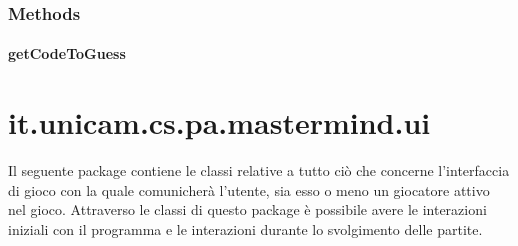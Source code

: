 \documentclass[letterpaper,10pt,italian]{sphinxmanual}
\begin{document}
\subsubsection{Methods}
\label{\detokenize{source/it/unicam/cs/pa/mastermind/players/RandomBotMaker:methods}}

\paragraph{getCodeToGuess}
\label{\detokenize{source/it/unicam/cs/pa/mastermind/players/RandomBotMaker:getcodetoguess}}

\begin{fulllineitems}
\label{\detokenize{source/it/unicam/cs/pa/mastermind/players/RandomBotMaker:it.unicam.cs.pa.mastermind.players.RandomBotMaker.getCodeToGuess(InteractionView)}}
\end{fulllineitems}



\section{it.unicam.cs.pa.mastermind.ui}
\label{\detokenize{source/it/unicam/cs/pa/mastermind/ui/package-index:it-unicam-cs-pa-mastermind-ui}}\label{\detokenize{source/it/unicam/cs/pa/mastermind/ui/package-index::doc}}
Il seguente package contiene le classi relative a tutto ciò che concerne l’interfaccia di gioco con la quale comunicherà l’utente, sia esso o meno un giocatore attivo nel gioco. Attraverso le classi di questo package è possibile avere le interazioni iniziali con il programma e le interazioni durante lo svolgimento delle partite.

\label{\detokenize{source/it/unicam/cs/pa/mastermind/ui/package-index:package-it.unicam.cs.pa.mastermind.ui}}
\end{document}
